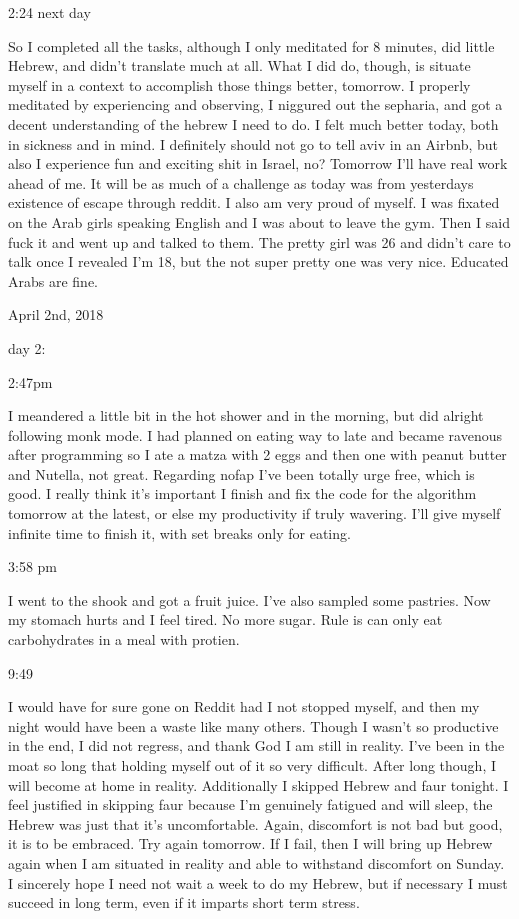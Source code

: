 2:24 next day

So I completed all the tasks, although I only meditated for 8 minutes,
did little Hebrew, and didn't translate much at all. What I did do,
though, is situate myself in a context to accomplish those things
better, tomorrow. I properly meditated by experiencing and observing, I
niggured out the sepharia, and got a decent understanding of the hebrew
I need to do. I felt much better today, both in sickness and in mind. I
definitely should not go to tell aviv in an Airbnb, but also I
experience fun and exciting shit in Israel, no? Tomorrow I'll have real
work ahead of me. It will be as much of a challenge as today was from
yesterdays existence of escape through reddit. I also am very proud of
myself. I was fixated on the Arab girls speaking English and I was about
to leave the gym. Then I said fuck it and went up and talked to them.
The pretty girl was 26 and didn't care to talk once I revealed I'm 18,
but the not super pretty one was very nice. Educated Arabs are fine.

\bigskip
\bigskip
April 2nd, 2018

day 2:

2:47pm

I meandered a little bit in the hot shower and in the morning, but did
alright following monk mode. I had planned on eating way to late and
became ravenous after programming so I ate a matza with 2 eggs and then
one with peanut butter and Nutella, not great. Regarding nofap I've been
totally urge free, which is good. I really think it's important I finish
and fix the code for the algorithm tomorrow at the latest, or else my
productivity if truly wavering. I'll give myself infinite time to finish
it, with set breaks only for eating.

3:58 pm

I went to the shook and got a fruit juice. I've also sampled some
pastries. Now my stomach hurts and I feel tired. No more sugar. Rule is
can only eat carbohydrates in a meal with protien.

9:49

I would have for sure gone on Reddit had I not stopped myself, and then
my night would have been a waste like many others. Though I wasn't so
productive in the end, I did not regress, and thank God I am still in
reality. I've been in the moat so long that holding myself out of it so
very difficult. After long though, I will become at home in reality.
Additionally I skipped Hebrew and faur tonight. I feel justified in
skipping faur because I'm genuinely fatigued and will sleep, the Hebrew
was just that it's uncomfortable. Again, discomfort is not bad but good,
it is to be embraced. Try again tomorrow. If I fail, then I will bring
up Hebrew again when I am situated in reality and able to withstand
discomfort on Sunday. I sincerely hope I need not wait a week to do my
Hebrew, but if necessary I must succeed in long term, even if it imparts
short term stress.

